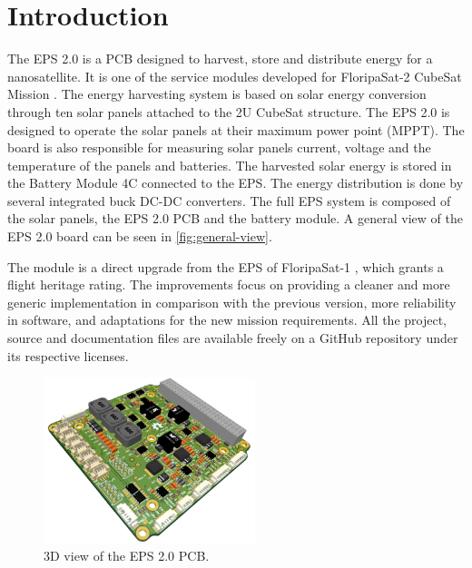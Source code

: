 %
%
%
%
%

%
%
%
%
%
%

\chapter{Introduction} \label{ch:introduction}

The EPS 2.0 is a PCB designed to harvest, store and distribute energy for a nanosatellite. It is one of the service modules developed for FloripaSat-2 CubeSat Mission \cite{floripasat2-doc}. The energy harvesting system is based on solar energy conversion through ten solar panels attached to the 2U CubeSat structure. The EPS 2.0 is designed to operate the solar panels at their maximum power point (MPPT). The board is also responsible for measuring solar panels current, voltage and the temperature of the panels and batteries. The harvested solar energy is stored in the Battery Module 4C \cite{bat4c} connected to the EPS. The energy distribution is done by several integrated buck DC-DC converters. The full EPS system is composed of the solar panels, the EPS 2.0 PCB and the battery module. A general view of the EPS 2.0 board can be seen in \autoref{fig:general-view}.

The module is a direct upgrade from the EPS of FloripaSat-1 \cite{eps-fsat}, which grants a flight heritage rating. The improvements focus on providing a cleaner and more generic implementation in comparison with the previous version, more reliability in software, and adaptations for the new mission requirements. All the project, source and documentation files are available freely on a GitHub repository \cite{eps2} under its respective licenses.

\begin{figure}[!ht]
    \begin{center}
        \includegraphics[width=0.55\textwidth]{figures/eps2-pcb-3d}
        \caption{3D view of the EPS 2.0 PCB.}
        \label{fig:general-view}
    \end{center}
\end{figure}